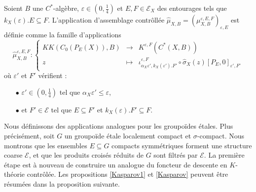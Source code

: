 \begin{definition}
Soient $B$ une $C^*$-algèbre, $\varepsilon\in (0,\frac{1}{4})$ et $E,F\in\mathcal E_X$ des entourages tels que $k_X(\varepsilon).E\subseteq F$. L'application d'assemblage contrôllée $\hat\mu_{X,B}=(\mu_{X,B}^{\varepsilon,E,F})_{\varepsilon,E}$ est définie comme la famille d'applications
\[\hat\mu_{X,B}^{\varepsilon, E,F} :\left\{\begin{array}{rcl} KK(C_0(P_E(X)),B) & \rightarrow & K^{\varepsilon, F}(C^*(X,B)) \\
					z & \mapsto & \iota_{\alpha_X \varepsilon',k_X(\varepsilon').F'}^{\varepsilon,F}\circ\hat\sigma_X(z)[P_{E},0]_{\varepsilon', F'}\end{array}\right.\]
où $\varepsilon'$ et $F'$ vérifient :
\begin{itemize}
\item[$\bullet$] $\varepsilon'\in (0,\frac{1}{4})$ tel que $\alpha_X \varepsilon'\leq \varepsilon$,
\item[$\bullet$] et $F'\in\mathcal E$ tel que $E\subseteq F'$ et $k_X(\varepsilon).F'\subseteq F$.
\end{itemize}
\end{definition}

Nous définissons des applications analogues pour les groupoïdes étales. Plus précisément, soit $G$ un groupoïde étale localement compact et $\sigma$-compact. Nous montrons que les ensembles $E\subseteq G$ compacts symmétriques forment une structure coarse $\mathcal E$, et que les produits croisés réduits de $G$ sont filtrés par $\mathcal E$. La première étape est à nouveau de construire un analogue du foncteur de descente en $K$-théorie contrôlée. Les propositions \ref{Kasparov1} et \ref{Kasparov} peuvent être résumées dans la proposition suivante. 

